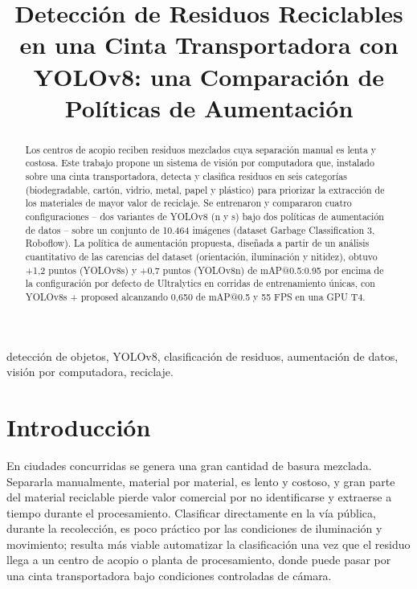 \documentclass[conference]{IEEEtran}
\begin{document}
\title{Detecci\'on de Residuos Reciclables en una Cinta Transportadora con YOLOv8: una Comparaci\'on de Pol\'iticas de Aumentaci\'on}

\author{
}

\maketitle

\begin{abstract}
Los centros de acopio reciben residuos mezclados cuya separaci\'on manual es lenta y costosa.
Este trabajo propone un sistema de visi\'on por computadora que, instalado sobre una cinta
transportadora, detecta y clasifica residuos en seis categor\'ias (biodegradable, cart\'on,
vidrio, metal, papel y pl\'astico) para priorizar la extracci\'on de los materiales de mayor
valor de reciclaje. Se entrenaron y compararon cuatro configuraciones -- dos variantes de
YOLOv8 (n y s) bajo dos pol\'iticas de aumentaci\'on de datos -- sobre un conjunto de 10.464
im\'agenes (dataset Garbage Classification 3, Roboflow). La pol\'itica de aumentaci\'on
propuesta, dise\~nada a partir de un an\'alisis cuantitativo de las carencias del dataset
(orientaci\'on, iluminaci\'on y nitidez), obtuvo +1,2 puntos (YOLOv8s) y +0,7 puntos
(YOLOv8n) de mAP@0.5:0.95 por encima de la configuraci\'on por defecto de Ultralytics en
corridas de entrenamiento \'unicas, con YOLOv8s + proposed alcanzando 0,650 de mAP@0.5 y 55 FPS
en una GPU T4.
\end{abstract}

\begin{IEEEkeywords}
detecci\'on de objetos, YOLOv8, clasificaci\'on de residuos, aumentaci\'on de datos, visi\'on
por computadora, reciclaje.
\end{IEEEkeywords}

\section{Introducci\'on}

En ciudades concurridas se genera una gran cantidad de basura mezclada. Separarla
manualmente, material por material, es lento y costoso, y gran parte del material reciclable
pierde valor comercial por no identificarse y extraerse a tiempo durante el procesamiento.
Clasificar directamente en la v\'ia p\'ublica, durante la recolecci\'on, es poco pr\'actico por
las condiciones de iluminaci\'on y movimiento; resulta m\'as viable automatizar la
clasificaci\'on una vez que el residuo llega a un centro de acopio o planta de procesamiento,
donde puede pasar por una cinta transportadora bajo condiciones controladas de c\'amara.
\end{document}
